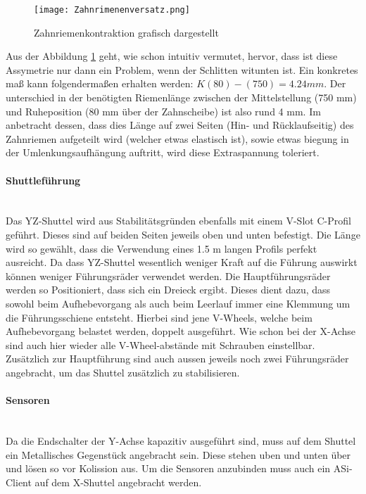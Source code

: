     \begin{figure}[H]
        \centering
        \texttt{[image: Zahnrimenenversatz.png]}
        \caption{Zahnriemenkontraktion grafisch dargestellt}
        \label{zahnriemenversatz}
    \end{figure}

Aus der Abbildung \ref{zahnriemenversatz} geht, wie schon intuitiv vermutet, hervor, dass ist diese Assymetrie nur dann ein Problem, wenn der Schlitten witunten ist. Ein konkretes maß kann folgendermaßen erhalten werden: \(K(80) - (750) = 4.24 \unit{mm}\). Der unterschied in der benötigten Riemenlänge zwischen der Mittelstellung (750 mm) und Ruheposition (80 mm über der Zahnscheibe) ist also rund 4 mm. Im anbetracht dessen, dass dies Länge auf zwei Seiten (Hin- und Rücklaufseitig) des Zahnriemen aufgeteilt wird (welcher etwas elastisch ist), sowie etwas biegung in der Umlenkungsaufhängung auftritt, wird diese Extraspannung toleriert.

\paragraph{Shuttleführung}\mbox{}\\
Das YZ-Shuttel wird aus Stabilitätsgründen ebenfalls mit einem V-Slot C-Profil geführt. Dieses sind auf beiden Seiten jeweils oben und unten befestigt. Die Länge wird so gewählt, dass die Verwendung eines 1.5 m langen Profils perfekt ausreicht. Da dass YZ-Shuttel wesentlich weniger Kraft auf die Führung auswirkt können weniger Führungsräder verwendet werden. Die Hauptführungsräder werden so Positioniert,  dass sich ein Dreieck ergibt. Dieses dient dazu, dass sowohl beim Aufhebevorgang als auch beim Leerlauf immer eine Klemmung um die Führungsschiene entsteht. Hierbei sind jene V-Wheels, welche beim Aufhebevorgang belastet werden, doppelt ausgeführt. Wie schon bei der X-Achse sind auch hier wieder alle V-Wheel-abstände mit Schrauben einstellbar. Zusätzlich zur Hauptführung sind auch aussen jeweils noch zwei Führungsräder angebracht, um das Shuttel zusätzlich zu stabilisieren.

\paragraph{Sensoren}\mbox{}\\
Da die Endschalter der Y-Achse kapazitiv ausgeführt sind, muss auf dem Shuttel ein Metallisches Gegenstück angebracht sein. Diese stehen uben und unten über und lösen so vor Kolission aus. Um die Sensoren anzubinden muss auch ein ASi-Client auf dem X-Shuttel angebracht werden.

